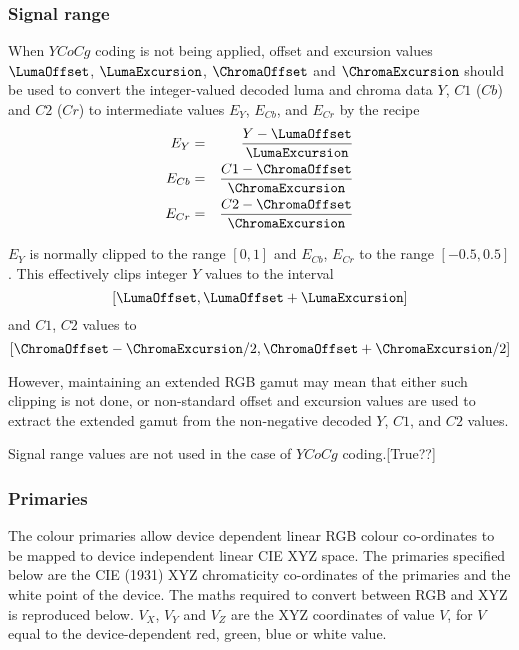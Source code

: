 \begin{informative*}
\subsubsection{Signal range}
\label{signalranges}

When $YCoCg$ coding is not being applied, offset and excursion values 
$\LumaOffset$, $\LumaExcursion$, $\ChromaOffset$ and
$\ChromaExcursion$ should be used to convert the
integer-valued decoded luma and chroma data $Y$, $C1$ ($Cb$) and $C2$ ($Cr$) 
to intermediate values $E_Y$, $E_{Cb}$, and $E_{Cr}$ by the recipe
\begin{eqnarray*}
E_Y & = & \dfrac{Y-\LumaOffset}{\LumaExcursion} \\
E_{Cb} & = & \dfrac{C1-\ChromaOffset}{\ChromaExcursion} \\
E_{Cr} & = & \dfrac{C2-\ChromaOffset}{\ChromaExcursion}
\end{eqnarray*}

$E_Y$ is normally clipped to the range $[0,1]$ and $E_{Cb}$, $E_{Cr}$
to the range $[-0.5,0.5]$. This effectively clips integer $Y$ values to 
the interval
\[ [\LumaOffset,\LumaOffset+\LumaExcursion] \]
and $C1$, $C2$ values to
\[ [\ChromaOffset-\ChromaExcursion/2,\ChromaOffset+\ChromaExcursion/2] \]

However, maintaining an extended RGB gamut may mean that either such
clipping is not done, or non-standard offset and excursion values are
used to extract the extended gamut from the non-negative decoded $Y$, $C1$,
and $C2$ values.

Signal range values are not used in the case of $YCoCg$ coding.[True??]

\begin{comment}
Non-default offset and excursion values cannot be coded if the chroma
format is YCoCg: default parameters should be used. However, even in
this case, EY, ECo, and ECg should not be calculated. Instead, direct
integer conversion to RGB should be done as described in Section . (In
fact, excursion values will be ignored in this integer conversion.)
\end{comment}

\subsubsection{Primaries}
\label{primaries}
The colour primaries allow device dependent linear RGB colour
co-ordinates to be mapped to device independent linear CIE XYZ space.
The primaries specified below are the CIE (1931) XYZ chromaticity
co-ordinates of the primaries and the white point of the device. The
maths required to convert between RGB and XYZ is reproduced below. $V_X$,
$V_Y$ and $V_Z$ are the XYZ coordinates of value $V$, for $V$ equal to
the device-dependent red, green, blue or white value.


\end{informative*}
